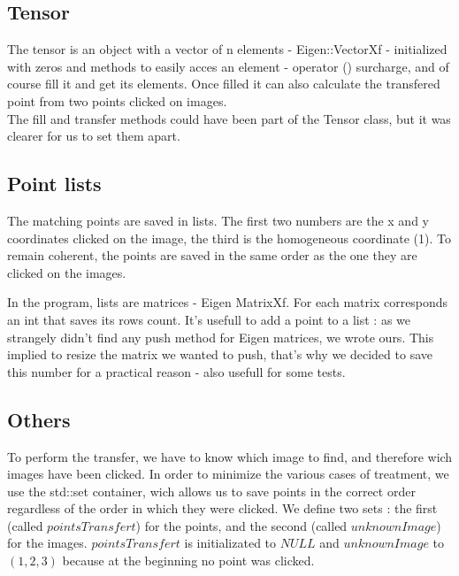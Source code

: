 \documentclass[a4paper,10pt]{report}
\begin{document}
\subsection{Tensor}

The tensor is an object with a vector of n elements - Eigen::VectorXf - initialized with zeros
and methods to easily acces an element - operator () surcharge, and of course fill it and get its elements.
Once filled it can also calculate the transfered point from two points clicked on images.
\\

The fill and transfer methods could have been part of the Tensor class, but it was clearer
for us to set them apart.
\\

\subsection{Point lists}

The matching points are saved in lists. The first two numbers are the x and y coordinates
clicked on the image, the third is the homogeneous coordinate (1). To remain coherent,
the points are saved in the same order as the one they are clicked on the images.

In the program, lists are matrices - Eigen MatrixXf. For each matrix corresponds an int that 
saves its rows count. It's usefull to add a point to a list : as we strangely didn't find
any push method for Eigen matrices, we wrote ours. This implied to resize the matrix we wanted
to push, that's why we decided to save this number for a practical reason - also usefull for some tests.
\\

\subsection{Others}

To perform the transfer, we have to know which image to find, and therefore wich images have been clicked. 
In order to minimize the various cases of treatment, we use the std::set container, wich allows us to save points 
in the correct order regardless of the order in which they were clicked.
We define two sets : the first (called $pointsTransfert$) for the points, and the second (called $unknownImage$) for the images.
$pointsTransfert$ is initializated to $NULL$ and $unknownImage$ to $(1, 2, 3)$ because at the beginning no point was clicked.
\end{document}
